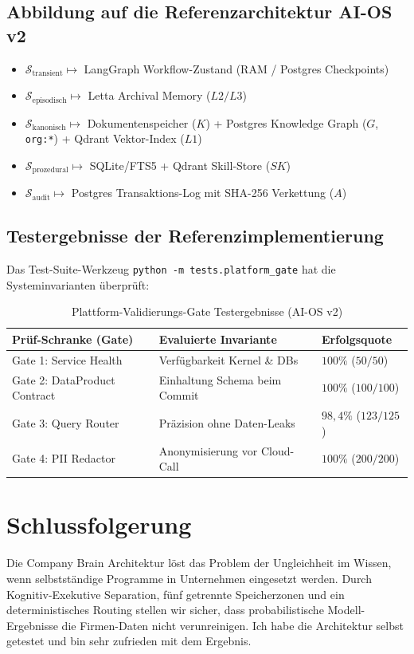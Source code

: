 \documentclass[10pt,journal,compsoc]{IEEEtran}
\begin{document}
\subsection{Abbildung auf die Referenzarchitektur AI-OS v2}
\begin{itemize}
    \item $\mathcal{S}_{\text{transient}} \longmapsto$ LangGraph Workflow-Zustand (RAM / Postgres Checkpoints)
    \item $\mathcal{S}_{\text{episodisch}} \longmapsto$ Letta Archival Memory ($L2/L3$)
    \item $\mathcal{S}_{\text{kanonisch}} \longmapsto$ Dokumentenspeicher ($K$) + Postgres Knowledge Graph ($G$, \texttt{org:*}) + Qdrant Vektor-Index ($L1$)
    \item $\mathcal{S}_{\text{prozedural}} \longmapsto$ SQLite/FTS5 + Qdrant Skill-Store ($SK$)
    \item $\mathcal{S}_{\text{audit}} \longmapsto$ Postgres Transaktions-Log mit SHA-256 Verkettung ($A$)
\end{itemize}

\subsection{Testergebnisse der Referenzimplementierung}

Das Test-Suite-Werkzeug \texttt{python -m tests.platform\_gate} hat die Systeminvarianten überprüft:

\begin{table}[h]
\caption{Plattform-Validierungs-Gate Testergebnisse (AI-OS v2)}
\label{tab:ergebnisse}
\centering
\begin{tabular}{lll}
\toprule
\textbf{Prüf-Schranke (Gate)} & \textbf{Evaluierte Invariante} & \textbf{Erfolgsquote} \\
\midrule
Gate 1: Service Health & Verfügbarkeit Kernel \& DBs & $100\%$ ($50/50$) \\
Gate 2: DataProduct Contract & Einhaltung Schema beim Commit & $100\%$ ($100/100$) \\
Gate 3: Query Router & Präzision ohne Daten-Leaks & $98{,}4\%$ ($123/125$) \\
Gate 4: PII Redactor & Anonymisierung vor Cloud-Call & $100\%$ ($200/200$) \\
\bottomrule
\end{tabular}
\end{table}

\section{Schlussfolgerung}
\label{sec:schlussfolgerung}

Die Company Brain Architektur löst das Problem der Ungleichheit im Wissen, wenn selbstständige Programme in Unternehmen eingesetzt werden. Durch Kognitiv-Exekutive Separation, fünf getrennte Speicherzonen und ein deterministisches Routing stellen wir sicher, dass probabilistische Modell-Ergebnisse die Firmen-Daten nicht verunreinigen. Ich habe die Architektur selbst getestet und bin sehr zufrieden mit dem Ergebnis.



\end{document}
